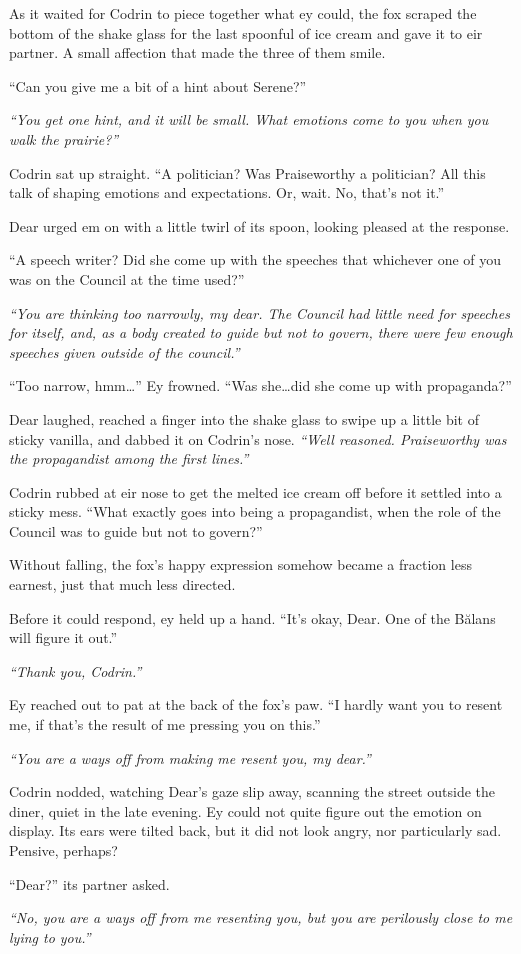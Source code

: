 As it waited for Codrin to piece together what ey could, the fox scraped the bottom of the shake glass for the last spoonful of ice cream and gave it to eir partner. A small affection that made the three of them smile.

``Can you give me a bit of a hint about Serene?''

\emph{``You get one hint, and it will be small. What emotions come to you when you walk the prairie?''}

Codrin sat up straight. ``A politician? Was Praiseworthy a politician? All this talk of shaping emotions and expectations. Or, wait. No, that's not it.''

Dear urged em on with a little twirl of its spoon, looking pleased at the response.

``A speech writer? Did she come up with the speeches that whichever one of you was on the Council at the time used?''

\emph{``You are thinking too narrowly, my dear. The Council had little need for speeches for itself, and, as a body created to guide but not to govern, there were few enough speeches given outside of the council.''}

``Too narrow, hmm\ldots{}'' Ey frowned. ``Was she\ldots did she come up with propaganda?''

Dear laughed, reached a finger into the shake glass to swipe up a little bit of sticky vanilla, and dabbed it on Codrin's nose. \emph{``Well reasoned. Praiseworthy was the propagandist among the first lines.''}

Codrin rubbed at eir nose to get the melted ice cream off before it settled into a sticky mess. ``What exactly goes into being a propagandist, when the role of the Council was to guide but not to govern?''

Without falling, the fox's happy expression somehow became a fraction less earnest, just that much less directed.

Before it could respond, ey held up a hand. ``It's okay, Dear. One of the Bălans will figure it out.''

\emph{``Thank you, Codrin.''}

Ey reached out to pat at the back of the fox's paw. ``I hardly want you to resent me, if that's the result of me pressing you on this.''

\emph{``You are a ways off from making me resent you, my dear.''}

Codrin nodded, watching Dear's gaze slip away, scanning the street outside the diner, quiet in the late evening. Ey could not quite figure out the emotion on display. Its ears were tilted back, but it did not look angry, nor particularly sad. Pensive, perhaps?

``Dear?'' its partner asked.

\emph{``No, you are a ways off from me resenting you, but you are perilously close to me lying to you.''}

